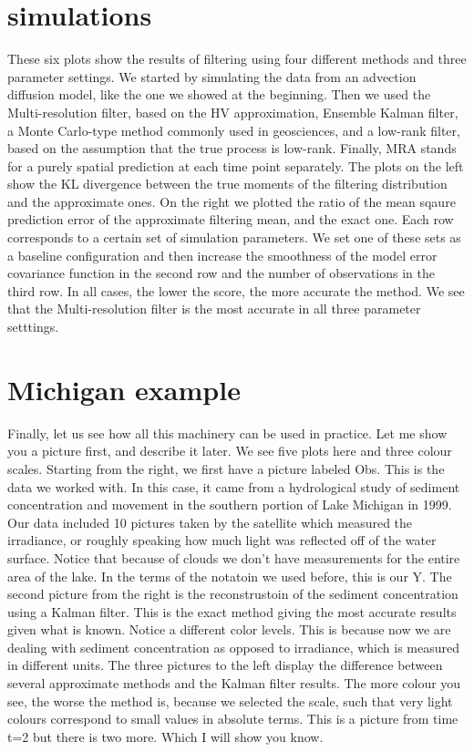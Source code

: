 \documentclass[12pt]{article} %
\begin{document}
\newpage
\section*{simulations}


These six plots show the results of filtering using four different methods and three parameter settings. We started by simulating the data from an advection diffusion model, like the one we showed at the beginning. Then we used the Multi-resolution filter, based on the HV approximation, Ensemble Kalman filter, a Monte Carlo-type method commonly used in geosciences, and a low-rank filter, based on the assumption that the true process is low-rank. Finally, MRA stands for a purely spatial prediction at each time point separately. The plots on the left show the KL divergence between the true moments of the filtering distribution and the approximate ones. On the right we plotted the ratio of the mean sqaure prediction error of the approximate filtering mean, and the exact one. Each row corresponds to a certain set of simulation parameters. We set one of these sets as a baseline configuration and then increase the smoothness of the model error covariance function in the second row and the number of observations in the third row. In all cases, the lower the score, the more accurate the method. We see that the Multi-resolution filter is the most accurate in all three parameter setttings. 




\newpage
\section*{Michigan example}


Finally, let us see how all this machinery can be used in practice. Let me show you a picture first, and describe it later. We see five plots here and three colour scales. Starting from the right, we first have a picture labeled Obs. This is the data we worked with. In this case, it came from a hydrological study of sediment concentration and movement in the southern portion of Lake Michigan in 1999. Our data included 10 pictures taken by the satellite which measured the irradiance, or roughly speaking how much light was reflected off of the water surface. Notice that because of clouds we don't have measurements for the entire area of the lake. In the terms of the notatoin we used before, this is our Y. The second picture from the right is the reconstrustoin of the sediment concentration using a Kalman filter. This is the exact method giving the most accurate results given what is known. Notice a different color levels. This is because now we are dealing with sediment concentration as opposed to irradiance, which is measured in different units. The three pictures to the left display the difference between several approximate methods and the Kalman filter results. The more colour you see, the worse the method is, because we selected the scale, such that very light colours correspond to small values in absolute terms. This is a picture from time t=2 but there is two more. Which I will show you know.
\end{document}
